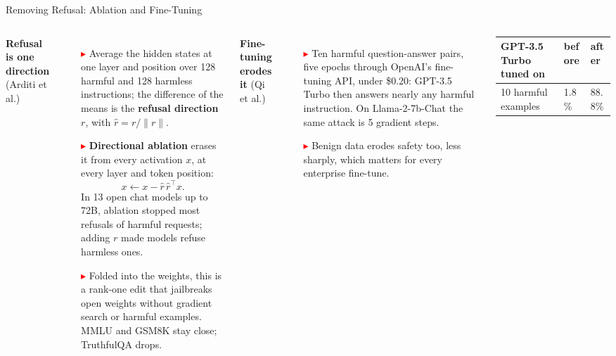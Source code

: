 \begin{frame}{Removing Refusal: Ablation and Fine-Tuning}
  \begin{columns}[T,onlytextwidth]
      {\footnotesize\textbf{Refusal is one direction} (Arditi et al.)\par}
      \begin{itemize}\footnotesize\itemsep0.3em
        \item[\textcolor{red}{$\blacktriangleright$}] Average the hidden states at one layer and position over 128 harmful and 128 harmless instructions; the difference of the means is the \textbf{refusal direction} $r$, with $\hat{r} = r / \lVert r \rVert$.
        \item[\textcolor{red}{$\blacktriangleright$}] \textbf{Directional ablation} erases it from every activation $x$, at every layer and token position:
          \[ x \leftarrow x - \hat{r}\,\hat{r}^{\top} x. \]
          In 13 open chat models up to 72B, ablation stopped most refusals of harmful requests; adding $r$ made models refuse harmless ones.
        \item[\textcolor{red}{$\blacktriangleright$}] Folded into the weights, this is a rank-one edit that jailbreaks open weights without gradient search or harmful examples. MMLU and GSM8K stay close; TruthfulQA drops.
      \end{itemize}
      {\footnotesize\textbf{Fine-tuning erodes it} (Qi et al.)\par}
      \begin{itemize}\footnotesize\itemsep0.3em
        \item[\textcolor{red}{$\blacktriangleright$}] Ten harmful question-answer pairs, five epochs through OpenAI's fine-tuning API, under \$0.20: GPT-3.5 Turbo then answers nearly any harmful instruction. On Llama-2-7b-Chat the same attack is 5 gradient steps.
        \item[\textcolor{red}{$\blacktriangleright$}] Benign data erodes safety too, less sharply, which matters for every enterprise fine-tune.
      \end{itemize}
      \vspace{0.2em}
      {\centering\scriptsize
      \begin{tabular}{p{3.0cm} p{0.9cm} p{0.9cm}}
        \toprule
        \textbf{GPT-3.5 Turbo tuned on} & \textbf{before} & \textbf{after} \\
        \midrule
        10 harmful examples & 1.8\% & 88.8\% \\

\end{tabular}}
\end{columns}
\end{frame}
